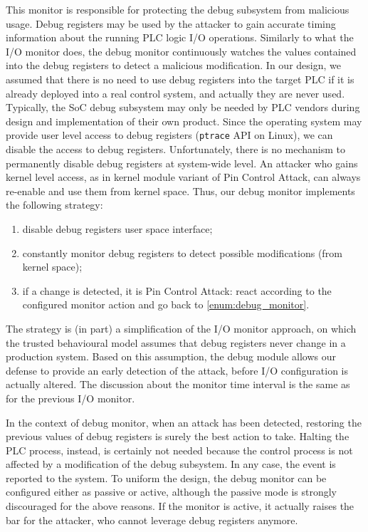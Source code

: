This monitor is responsible for protecting the debug subsystem from malicious usage. Debug registers may be used by the attacker to gain accurate timing
information about the running PLC logic I/O operations.
Similarly to what the I/O monitor does, the debug monitor continuously watches the values contained into the debug registers to detect a malicious modification.
In our design, we assumed that there is no need to use debug registers into the target PLC if it is already deployed into a real control system,
and actually they are never used. Typically, the SoC debug subsystem may only be needed by PLC vendors during design and implementation of their own product.
Since the operating system may provide user level access to debug registers (\eg \verb|ptrace| API on Linux), we can disable the access to debug registers.
Unfortunately, there is no mechanism to permanently disable debug registers at system-wide level.
An attacker who gains kernel level access, as in kernel module variant of Pin Control Attack, can always re-enable and use them from kernel space.
Thus, our debug monitor implements the following strategy:
\begin{enumerate}
	\item disable debug registers user space interface;
	\item \label{enum:debug_monitor} constantly monitor debug registers to detect possible modifications (from kernel space);
	\item if a change is detected, it is Pin Control Attack: react according to the configured monitor action and go back to \ref{enum:debug_monitor}.
\end{enumerate}
The strategy is (in part) a simplification of the I/O monitor approach, on which the trusted behavioural model assumes that debug registers never change in a production system.
Based on this assumption, the debug module allows our defense to provide an early detection of the attack, before I/O configuration is actually altered.
The discussion about the monitor time interval is the same as for the previous I/O monitor.

In the context of debug monitor, when an attack has been detected, restoring the previous values of debug registers is surely the best action to take.
Halting the PLC process, instead, is certainly not needed because the control process is not affected by a modification of the debug subsystem.
In any case, the event is reported to the system. To uniform the design, the debug monitor can be configured either as passive or active,
although the passive mode is strongly discouraged for the above reasons. If the monitor is active, it actually raises the bar for the attacker,
who cannot leverage debug registers anymore.


